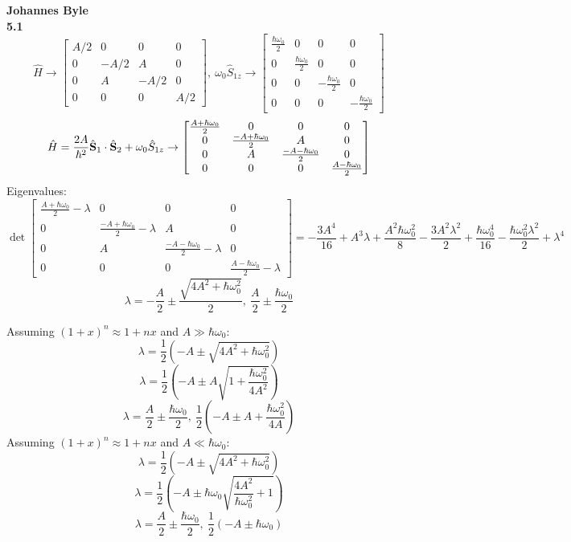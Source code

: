 \documentclass[english]{article}
\begin{document}
\textbf{Johannes Byle}\\
\noindent
\textbf{5.1}\\
\[
\hat{H}\rightarrow
\begin{bmatrix}
A/2 & 0 & 0 & 0\\
0 & -A/2 & A & 0\\
0 & A & -A/2 & 0\\
0 & 0 & 0 & A/2
\end{bmatrix}
,\ 
\omega_0\hat{S}_{1z}\rightarrow
\begin{bmatrix}
\tfrac{\hbar\omega_0}{2} & 0 & 0 & 0\\
0 & \tfrac{\hbar\omega_0}{2} & 0 & 0\\
0 & 0 & -\tfrac{\hbar\omega_0}{2} & 0\\
0 & 0 & 0 & -\tfrac{\hbar\omega_0}{2}
\end{bmatrix}
\]
\[
\hat{H}=\frac{2A}{\hbar^2}\hat{\vb{S}}_1\cdot\hat{\vb{S}}_2+\omega_0\hat{S}_{1z}\rightarrow
\begin{bmatrix}
\tfrac{A+\hbar\omega_0}{2} & 0 & 0 & 0\\
0 & \tfrac{-A+\hbar\omega_0}{2} & A & 0\\
0 & A & \tfrac{-A-\hbar\omega_0}{2} & 0\\
0 & 0 & 0 & \tfrac{A-\hbar\omega_0}{2}
\end{bmatrix}
\]
Eigenvalues:
\[
\det
\begin{bmatrix}
\tfrac{A+\hbar\omega_0}{2}-\lambda & 0 & 0 & 0\\
0 & \tfrac{-A+\hbar\omega_0}{2}-\lambda & A & 0\\
0 & A & \tfrac{-A-\hbar\omega_0}{2}-\lambda & 0\\
0 & 0 & 0 & \tfrac{A-\hbar\omega_0}{2}-\lambda
\end{bmatrix}
=- \frac{3 A^{4}}{16} + A^{3} \lambda + \frac{A^{2} \hbar\omega_0^{2}}{8} - \frac{3 A^{2} \lambda^{2}}{2} + \frac{\hbar\omega_0^{4}}{16} - \frac{\hbar\omega_0^{2} \lambda^{2}}{2} + \lambda^{4}
\]
$$\lambda = - \frac{A}{2} \pm \frac{\sqrt{4 A^{2} + \hbar\omega_0^{2}}}{2}, \  \frac{A}{2} \pm \frac{\hbar\omega_0}{2}$$
\begin{multicols}{2}
Assuming $(1+x)^n\approx1+nx$ and $A\gg\hbar\omega_0$:
$$\lambda=\frac{1}{2}\left(-A\pm\sqrt{4 A^{2} + \hbar\omega_0^{2}}\right)$$
$$\lambda=\frac{1}{2}\left(-A\pm A\sqrt{1 + \frac{\hbar\omega_0^{2}}{4A^2}}\right)$$
$$\lambda=\frac{A}{2} \pm \frac{\hbar\omega_0}{2},\ \frac{1}{2}\left(-A\pm A + \frac{\hbar\omega_0^{2}}{4A}\right)$$
Assuming $(1+x)^n\approx1+nx$ and $A\ll\hbar\omega_0$:
$$\lambda=\frac{1}{2}\left(-A\pm\sqrt{4 A^{2} + \hbar\omega_0^{2}}\right)$$
$$\lambda=\frac{1}{2}\left(-A\pm\hbar\omega_0\sqrt{\frac{4A^{2}}{\hbar\omega_0^2} + 1}\right)$$
$$\lambda=\frac{A}{2} \pm \frac{\hbar\omega_0}{2},\ \frac{1}{2}\left(-A\pm\hbar\omega_0\right)$$
\end{multicols}
\end{document}
